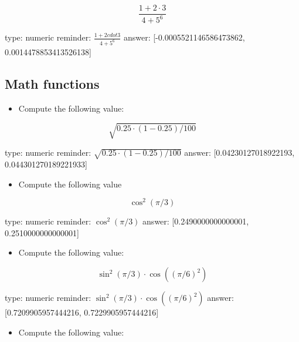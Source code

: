 \documentclass[12pt]{article}
\begin{document}
\[
\frac{1 + 2\cdot 3}{4 + 5^6}
\]

\begin{answer}
    type: numeric
    reminder: \( \frac{1 + 2cdot 3}{4 + 5^6} \)
    answer: [-0.0005521146586473862, 0.0014478853413526138]

\end{answer}

\subsection{Math functions}

\begin{itemize}
\itemsep1pt\parskip0pt
\item
  Compute the following value:
\end{itemize}

\[
\sqrt{0.25\cdot(1-0.25)/100}
\]

\begin{answer}
    type: numeric
    reminder: \( \sqrt{0.25\cdot(1-0.25)/100} \)
    answer: [0.04230127018922193, 0.044301270189221933]

\end{answer}

\begin{itemize}
\itemsep1pt\parskip0pt
\item
  Compute the following value
\end{itemize}

\[
\cos^2(\pi/3)
\]

\begin{answer}
    type: numeric
    reminder: \( \cos^2(\pi/3) \)
    answer: [0.2490000000000001, 0.2510000000000001]

\end{answer}

\begin{itemize}
\itemsep1pt\parskip0pt
\item
  Compute the following value:
\end{itemize}

\[
\sin^2(\pi/3)  \cdot \cos((\pi/6)^2)
\]

\begin{answer}
    type: numeric
    reminder: \( \sin^2(\pi/3)  \cdot \cos((\pi/6)^2) \)
    answer: [0.7209905957444216, 0.7229905957444216]

\end{answer}

\begin{itemize}
\itemsep1pt\parskip0pt
\item
  Compute the following value:
\end{itemize}
\end{document}
